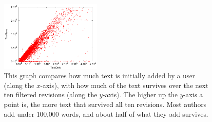 %
\begin{figure}[t]
    \begin{center}
    \includegraphics[width=0.45\textwidth]{part-I10-contrib/graphs/score-zoom-revisions-textonly}
    \end{center}
    \caption[Measuring short term text survival]{
    	This graph compares how much text is initially added
	by a user (along the $x$-axis), with how much
	of the text survives over the next ten filtered revisions
	(along the $y$-axis).
	The higher up the $y$-axis a point is, the more
	text that survived all ten revisions.
	Most authors add under 100,000 words,
	and about half of what they add survives.
    }
    \label{fig-zoom-revisions-textonly}
\end{figure}
